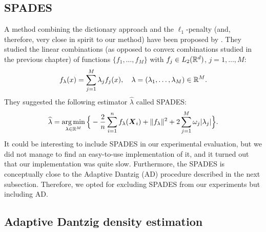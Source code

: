 \subsection{SPADES}
A method combining the dictionary approach and the $\ell_1$-penalty (and, therefore, very close in spirit to our method) have been proposed by \citep{SPADES}. They studied the linear combinations (as opposed to convex combinations studied in the previous chapter) of functions $\{f_1,\dots,f_M\}$ with $f_j\in L_2({\mathbb R}^d)$, $j=1,\dots,M$:
\begin{equation}
    f_{\lambda}(x)=\sum_{j=1}^M\lambda_j f_j(x), \quad \lambda = (\lambda_1,\dots,\lambda_M)\in {\mathbb R}^M.
\end{equation}
They suggested the following estimator $\hat \lambda$ called SPADES:
\begin{equation}
    \widehat\lambda = \operatorname*{arg\,min}_{\lambda \in {\mathbb R}^M}\Big\{-\frac{2}{n}\sum_{i=1}^n f_{\lambda}(\boldsymbol X_i) +\|f_{\lambda}\|^2 +2\sum_{j=1}^M\omega_j|\lambda_j|\Big\}.
\end{equation}
It could be interesting to include SPADES in our experimental evaluation, but we did not manage to find an easy-to-use implementation of it, and it turned out that our implementation was quite slow. Furthermore, the SPADES is conceptually close to the Adaptive Dantzig (AD) \citep{Bertin} procedure described in the next subsection. Therefore, we opted for excluding SPADES from our experiments but including AD.

\subsection{Adaptive Dantzig density estimation\label{ad_section}}

